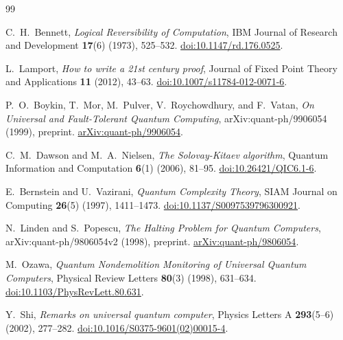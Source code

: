 \begin{thebibliography}{99}
\raggedright

C.~H.~Bennett,
\emph{Logical Reversibility of Computation},
IBM Journal of Research and Development \textbf{17}(6) (1973), 525--532.
\href{https://doi.org/10.1147/rd.176.0525}{doi:10.1147/rd.176.0525}.

L.~Lamport,
\emph{How to write a 21st century proof},
Journal of Fixed Point Theory and Applications \textbf{11} (2012), 43--63.
\href{https://doi.org/10.1007/s11784-012-0071-6}{doi:10.1007/s11784-012-0071-6}.

P.~O.~Boykin, T.~Mor, M.~Pulver, V.~Roychowdhury, and F.~Vatan,
\emph{On Universal and Fault-Tolerant Quantum Computing},
arXiv:quant-ph/9906054 (1999), preprint.
\href{https://arxiv.org/abs/quant-ph/9906054}{arXiv:quant-ph/9906054}.

C.~M.~Dawson and M.~A.~Nielsen,
\emph{The Solovay-Kitaev algorithm},
Quantum Information and Computation \textbf{6}(1) (2006), 81--95.
\href{https://doi.org/10.26421/QIC6.1-6}{doi:10.26421/QIC6.1-6}.

E.~Bernstein and U.~Vazirani,
\emph{Quantum Complexity Theory},
SIAM Journal on Computing \textbf{26}(5) (1997), 1411--1473.
\href{https://doi.org/10.1137/S0097539796300921}{doi:10.1137/S0097539796300921}.

N.~Linden and S.~Popescu,
\emph{The Halting Problem for Quantum Computers},
arXiv:quant-ph/9806054v2 (1998), preprint.
\href{https://arxiv.org/abs/quant-ph/9806054}{arXiv:quant-ph/9806054}.

M.~Ozawa,
\emph{Quantum Nondemolition Monitoring of Universal Quantum Computers},
Physical Review Letters \textbf{80}(3) (1998), 631--634.
\href{https://doi.org/10.1103/PhysRevLett.80.631}{doi:10.1103/PhysRevLett.80.631}.

Y.~Shi,
\emph{Remarks on universal quantum computer},
Physics Letters A \textbf{293}(5--6) (2002), 277--282.
\href{https://doi.org/10.1016/S0375-9601(02)00015-4}{doi:10.1016/S0375-9601(02)00015-4}.
\end{thebibliography}

